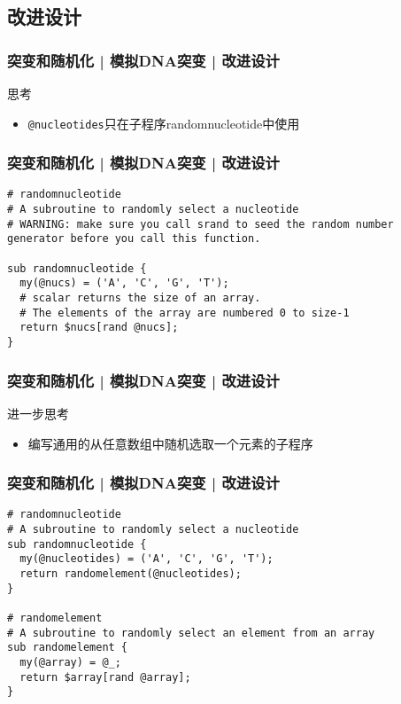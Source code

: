 \subsection{改进设计}
\begin{frame}[fragile]
  \frametitle{突变和随机化 | 模拟DNA突变 | 改进设计}
  \begin{block}{思考}
    \begin{itemize}
      \item \verb|@nucleotides|只在子程序randomnucleotide中使用
    \end{itemize}
  \end{block}
\end{frame}

\begin{frame}[fragile]
  \frametitle{突变和随机化 | 模拟DNA突变 | 改进设计}
  \vspace{-1.5em}
\begin{lstlisting}
# randomnucleotide
# A subroutine to randomly select a nucleotide
# WARNING: make sure you call srand to seed the random number generator before you call this function.

sub randomnucleotide {
  my(@nucs) = ('A', 'C', 'G', 'T');
  # scalar returns the size of an array. 
  # The elements of the array are numbered 0 to size-1
  return $nucs[rand @nucs];
}
\end{lstlisting}
\end{frame}

\begin{frame}[fragile]
  \frametitle{突变和随机化 | 模拟DNA突变 | 改进设计}
  \begin{block}{进一步思考}
    \begin{itemize}
      \item 编写通用的从任意数组中随机选取一个元素的子程序
    \end{itemize}
  \end{block}
\end{frame}

\begin{frame}[fragile]
  \frametitle{突变和随机化 | 模拟DNA突变 | 改进设计}
  \vspace{-1.5em}
\begin{lstlisting}
# randomnucleotide
# A subroutine to randomly select a nucleotide
sub randomnucleotide {
  my(@nucleotides) = ('A', 'C', 'G', 'T');
  return randomelement(@nucleotides);
}

# randomelement
# A subroutine to randomly select an element from an array
sub randomelement {
  my(@array) = @_;
  return $array[rand @array];
}
\end{lstlisting}
\end{frame}

